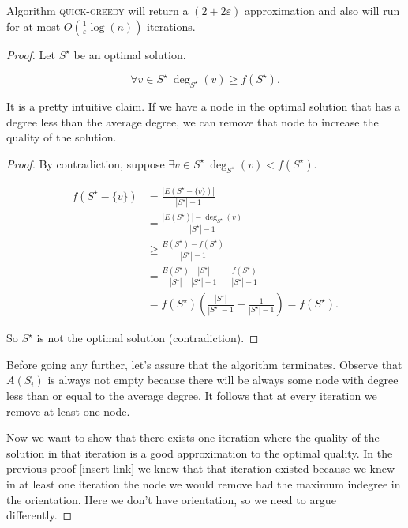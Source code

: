 \begin{thm}
	Algorithm \textsc{quick-greedy} will return a $(2 + 2\varepsilon)$ approximation and also will run for at most $O\left(\frac{1}{\varepsilon}\log(n)\right)$ iterations.
\end{thm}
\begin{proof}
	
	Let $S^\star$ be an optimal solution.
	
	\begin{claim}\label{clm:dsg:den_minor_deg}
		\begin{equation}
		\forall v \in S^\star\ \deg_{S^\star}(v) \geq f(S^\star).
		\end{equation}
	\end{claim}
	It is a pretty intuitive claim. If we have a node in the optimal solution that has a degree less than the average degree, we can remove that node to increase the quality of the solution.
	\begin{proof}
	By contradiction, suppose $\exists v \in S^\star\ \deg_{S^\star}(v) < f(S^\star)$.
	
	\begin{align}
	f(S^\star - \{v\}) &= \frac{|E(S^\star - \{v\})|}{|S^\star| - 1} \\
		&= \frac{|E(S^\star)| - \deg_{S^\star}(v)}{|S^\star| - 1}\\
		&\geq \frac{E(S^\star) - f(S^\star)}{|S^\star| - 1}\\
		&= \frac{E(S^\star)}{|S^\star|} \frac{|S^\star|}{|S^\star| - 1} - \frac{f(S^\star)}{|S^\star| - 1}\\
		&= f(S^\star)\left(\frac{|S^\star|}{|S^\star| - 1} - \frac{1}{|S^\star| - 1}\right) = f(S^\star).
	\end{align}
	
	So $S^\star$ is not the optimal solution (contradiction).
\end{proof}
Before going any further, let's assure that the algorithm terminates. Observe that $A(S_i)$ is always not empty because there will be always some node with degree less than or equal to the average degree. It follows that at every iteration we remove at least one node.

Now we want to show that there exists one iteration where the quality of the solution in that iteration is a good approximation to the optimal quality. In the previous proof [insert link] we knew that that iteration existed because we knew in at least one iteration the node we would remove had the maximum indegree in the orientation. Here we don't have orientation, so we need to argue differently. 


\end{proof}
